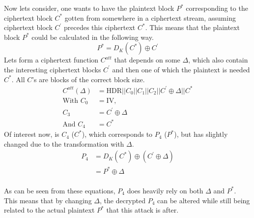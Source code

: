 \documentclass[10pt,conference,a4paper]{IEEEtran}
\begin{document}
Now lets consider, one wants to have the plaintext block $P^{*}$ corresponding to the ciphertext block $C^{*}$ gotten from somewhere in a ciphertext stream, assuming ciphertext block $C^{'}$ precedes this ciphertext $C^{*}$. This means that the plaintext block $P^{*}$ could be calculated in the following way.
\[ P^{*} = D_K(C^{*}) \oplus C^{'} \]
Lets form a ciphertext function $C^{att}$ that depends on some $\Delta$, which also contain the interesting ciphertext blocks $C^{'}$ and then one of which the plaintext is needed $C^{*}$. All $C$'s are blocks of the correct block size.
\[ \begin{split}
C^{att}(\Delta) &= \text{HDR} || C_0 || C_1 || C_2 || C^{'} \oplus \Delta || C^{*} \\
\text{With } C_0 &= \text{IV}, \\
C_3 &= C^{'} \oplus \Delta \\
\text{And } C_4 &= C^{*}
\end{split}  \]
Of interest now, is $C_4$ ($C^{*}$), which corresponds to $P_4$ ($P^{*}$), but has slightly changed due to the transformation with $\Delta$.
\[ \begin{split}
P_4 &= D_K(C^{*}) \oplus (C^{'} \oplus \Delta) \\
&= P^{*} \oplus \Delta \\
\end{split} \]

As can be seen from these equations, $P_4$ does heavily rely on both $\Delta$ and $P^{*}$. This means that by changing $\Delta$, the decrypted $P_4$ can be altered while still being related to the actual plaintext $P^{*}$ that this attack is after.
\end{document}
